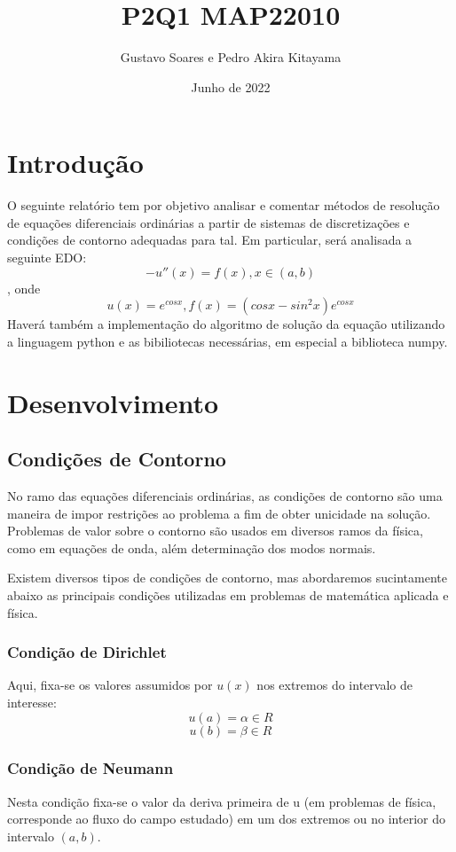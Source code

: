 \documentclass[pdftex, 12pt, a4paper]{report}
\title{\uppercase{P2Q1 MAP22010}}
\author{Gustavo Soares e Pedro Akira Kitayama}
\date{Junho de 2022}
\begin{document}
\setcounter{page}{1}

\pagebreak
\maketitle
\tableofcontents


\pagebreak
\chapter{Introdução}
O seguinte relatório tem por objetivo analisar e comentar métodos de resolução de equações diferenciais ordinárias a partir de sistemas de discretizações e condições de contorno adequadas para tal. Em particular, será analisada a seguinte EDO:
$$-u''(x) = f(x), x \in (a,b)$$, onde
$$u(x) = e^{cos{x}}, f(x) = (cosx - sin^{2}x)e^{cosx}$$
Haverá também a implementação do algoritmo de solução da equação utilizando a linguagem python e as bibiliotecas necessárias, em especial a biblioteca numpy.

\pagebreak
\chapter{Desenvolvimento}
\section{Condições de Contorno}
No ramo das equações diferenciais ordinárias, as condições de contorno são uma maneira de impor restrições ao problema a fim de obter unicidade na solução. Problemas de valor sobre o contorno são usados em diversos ramos da física, como em equações de onda, além determinação dos modos normais.

Existem diversos tipos de condições de contorno, mas abordaremos sucintamente abaixo as principais condições utilizadas em problemas de matemática aplicada e  física.
\subsection{Condição de Dirichlet}
Aqui, fixa-se os valores assumidos por $u(x)$ nos extremos do intervalo de interesse: $$u(a) = \alpha \in R$$
$$u(b) = \beta \in R$$
\subsection{Condição de Neumann}
Nesta condição fixa-se o valor da deriva primeira de u (em problemas de física, corresponde ao fluxo do campo estudado) em um dos extremos ou no interior do intervalo $(a,b)$.
\end{document}
